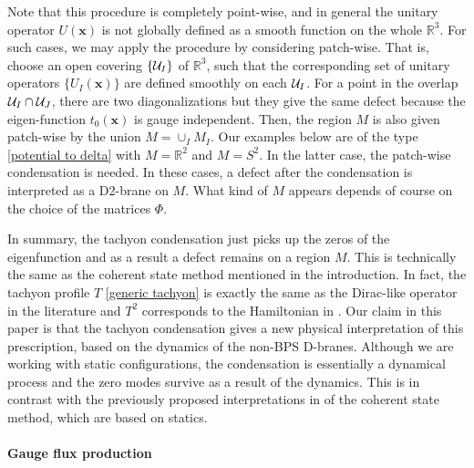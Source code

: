 \documentclass[12pt]{article}
\numberwithin{equation}{section}
\def\real{\mathbb{R}}
\begin{document}
Note that this procedure is completely point-wise, 
and in general the unitary operator $U(\boldsymbol{x})$ is not globally defined 
as a smooth function on the whole $\real^3$.
For such cases, we may apply the procedure by considering patch-wise.
That is, choose an open covering $\{ {\cal U}_I\}$ of $\real^3$, 
such that the corresponding set of unitary operators $\{U_I (\boldsymbol{x})\}$ 
are defined smoothly on each ${\cal U}_I$.
For a point in the overlap ${\cal U}_I \cap {\cal U}_J$, there are two 
diagonalizations
but they give the same defect because the eigen-function $t_0(\boldsymbol{x})$ is 
gauge independent.
Then, the region $M$ is also given patch-wise by the union $M=\cup_I M_I$.
Our examples below are of the type \eqref{potential to delta}
with $M=\real^2$ and $M=S^2$.
In the latter case, the patch-wise condensation is needed.
In these cases, a defect after the condensation is interpreted as a D2-brane on $M$.  
What kind of $M$ appears depends of course on the choice of the matrices $\Phi$.

In summary, the tachyon condensation just picks up the zeros of the eigenfunction 
and as a result a defect remains on a region $M$.
This is technically the same as the coherent state method mentioned in the introduction.
In fact, the tachyon profile $T$ \eqref{generic tachyon} is exactly the
same as the {Dirac-like} operator
in the literature {\cite{Berenstein2012,DeBadyn2015,Karczmarek2015,Schneiderbauer2016}
and $T^2$ corresponds to the Hamiltonian in \cite{Ishiki2015,Ishiki2016}.}
Our claim in this paper is that the tachyon condensation gives a new
physical interpretation of this prescription, based on the dynamics of the 
non-BPS D-branes. Although we are working with static configurations, the condensation is essentially a dynamical process and the zero modes survive as a result of the dynamics. 
This is in contrast with the previously proposed interpretations in \cite{Berenstein2012,Ishiki2015,Schneiderbauer2016}
of the coherent state method, which are based on statics.


\paragraph{Gauge flux production}
\end{document}
